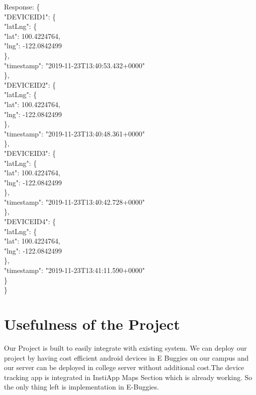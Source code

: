 \documentclass{article}
\begin{document}
\begin{itemize}
Response:
\{\\
    "DEVICEID1": \{\\
        "latLng": \{\\
            "lat": 100.4224764,\\
            "lng": -122.0842499\\
        \},\\
        "timestamp": "2019-11-23T13:40:53.432+0000"\\
    \},\\
    "DEVICEID2": \{\\
        "latLng": \{\\
            "lat": 100.4224764,\\
            "lng": -122.0842499\\
        \},\\
        "timestamp": "2019-11-23T13:40:48.361+0000"\\
    \},\\
    "DEVICEID3": \{\\
        "latLng": \{\\
            "lat": 100.4224764,\\
            "lng": -122.0842499\\
        \},\\
        "timestamp": "2019-11-23T13:40:42.728+0000"\\
    \},\\
    "DEVICEID4": \{\\
        "latLng": \{\\
            "lat": 100.4224764,\\
            "lng": -122.0842499\\
        \},\\
        "timestamp": "2019-11-23T13:41:11.590+0000"\\
    \}\\
\}
    
\end{itemize}
\section{Usefulness of the Project}
Our Project is built to easily integrate with existing system. We can deploy our project by having cost efficient android devices in E Buggies on our campus and our server can be deployed in college server without additional cost.The device tracking app is integrated in InstiApp Maps Section which is already working. So the only thing left is implementation in E-Buggies.
\end{document}
